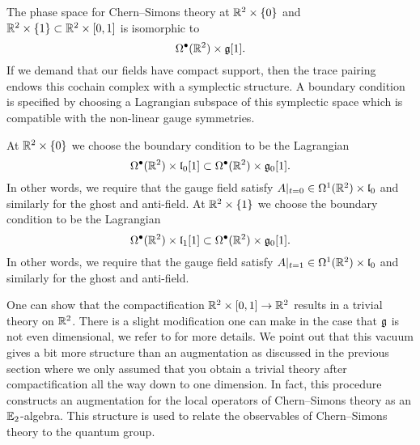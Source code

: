 \documentclass[11pt]{amsart}
\begin{document}
The phase space for Chern--Simons theory at $\mathbb R^2 \times \{0\}$ and $\mathbb R^2 \times \{1\} \subset \mathbb R^2 \times [0,1]$ is isomorphic to 
\[
\Omega^\bullet(\mathbb R^2) \times \mathfrak g[1] .
\]
If we demand that our fields have compact support, then the trace pairing endows this cochain complex with a symplectic structure. 
A boundary condition is specified by choosing a Lagrangian subspace of this symplectic space which is compatible with the non-linear gauge symmetries. 

At $\mathbb R^2 \times \{0\}$ we choose the boundary condition to be the Lagrangian
\[
\Omega^\bullet(\mathbb R^2) \times \mathfrak{l}_0 [1] \subset \Omega^\bullet(\mathbb R^2) \times \mathfrak{g}_0 [1]  .
\]
In other words, we require that the gauge field satisfy $A|_{t=0} \in \Omega^1 (\mathbb R^2) \times \mathfrak{l}_0$ and similarly for the ghost and anti-field. 
At $\mathbb R^2 \times \{1\}$ we choose the boundary condition to be the Lagrangian
\[
\Omega^\bullet(\mathbb R^2) \times \mathfrak{l}_1 [1] \subset \Omega^\bullet(\mathbb R^2) \times \mathfrak{g}_0 [1]  .
\]
In other words, we require that the gauge field satisfy $A|_{t=1} \in \Omega^1 (\mathbb R^2) \times \mathfrak{l}_0$ and similarly for the ghost and anti-field. 

One can show that the compactification $\mathbb R^2 \times [0,1] \to \mathbb R^2$ results in a trivial theory on $\mathbb R^2$. 
There is a slight modification one can make in the case that $\mathfrak g$ is not even dimensional, we refer to \cite{Nanna} for more details. 
We point out that this vacuum gives a bit more structure than an augmentation as discussed in the previous section where we only assumed that you obtain a trivial theory after compactification all the way down to one dimension. 
In fact, this procedure constructs an augmentation for the local operators of Chern--Simons theory as an $\mathbb E_2$-algebra. 
This structure is used to relate the observables of Chern--Simons theory to the quantum group.
\end{document}
